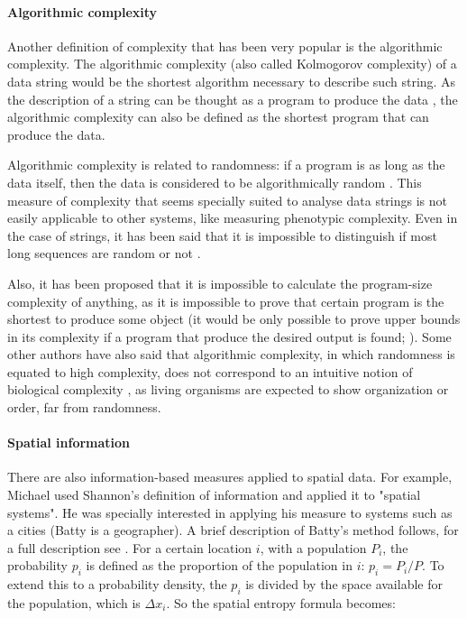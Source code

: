 \paragraph{Algorithmic complexity}
Another definition of complexity that has been very popular is the algorithmic complexity. The algorithmic complexity (also called Kolmogorov complexity) of a data string would be the shortest algorithm necessary to describe such string. As the description of a string can be thought as a program to produce the data \citep{Kolmogorov1963,Wolfram2002}, the algorithmic complexity can also be defined as the shortest program that can produce the data.

Algorithmic complexity is related to randomness: if a program is as long as the data itself, then the data is considered to be algorithmically random \citep{Wolfram2002}. This measure of complexity that seems specially suited to analyse data strings is not easily applicable to other systems, like measuring phenotypic complexity. Even in the case of strings, it has been said that it is impossible to distinguish if most long sequences are random or not \citep{Wolfram2002}. 

Also, it has been proposed that it is impossible to calculate the program-size complexity of anything, as it is impossible to prove that certain program is the shortest to produce some object (it would be only possible to prove upper bounds in its complexity if a program that produce the desired output is found; \citealp{chaitin1999unknowable}).
Some other authors have also said that algorithmic complexity, in which randomness is equated to high complexity, does not correspond to an intuitive notion of biological complexity \citep{Adami2002}, as living organisms are expected to show organization or order, far from randomness. 

\paragraph{Spatial information}
There are also information-based measures applied to spatial data. For example, Michael \citet{Batty1974} used Shannon's definition of information and applied it to "spatial systems". He was specially interested in applying his measure to systems such as a cities (Batty is a geographer). A brief description of Batty's method follows, for a full description see \citep{Batty1974,Batty2014}. For a certain location $i$, with a population $P_{i}$, the probability $p_{i}$ is defined as the proportion of the population in $i$: $p_{i} = P_{i}/P$.  To extend this to a probability density, the $p_{i}$ is divided by the space available for the population, which is $\Delta x_{i}$. So the spatial entropy formula becomes:

